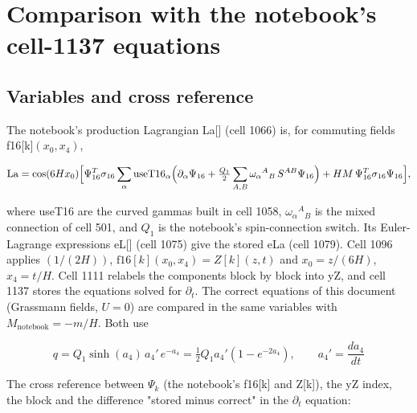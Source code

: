 \documentclass[11pt]{article}
\begin{document}
\section{Comparison with the notebook's cell-1137 equations}

\subsection{Variables and cross reference}

The notebook's production Lagrangian La[] (cell 1066) is, for commuting fields f16[k]$(x_0,x_4)$,

\[
\mathrm{La}=\cos(6Hx_0)\Bigl[\Psi_{16}^T\sigma_{16}\sum_{\alpha}\mathrm{useT16}_\alpha\Bigl(\partial_\alpha\Psi_{16}+\tfrac{Q_1}{2}\sum_{A,B}\omega_\alpha{}^A{}_B\,S^{AB}\Psi_{16}\Bigr)+HM\,\Psi_{16}^T\sigma_{16}\Psi_{16}\Bigr],
\]

where useT16 are the curved gammas built in cell 1058, $\omega_\alpha{}^A{}_B$ is the mixed connection of cell 501, and $Q_1$ is the notebook's spin-connection switch. Its Euler-Lagrange expressions eL[] (cell 1075) give the stored eLa (cell 1079). Cell 1096 applies $(1/(2H))$, $\mathrm{f16}[k](x_0,x_4)=Z[k](z,t)$ and $x_0=z/(6H)$, $x_4=t/H$. Cell 1111 relabels the components block by block into yZ, and cell 1137 stores the equations solved for $\partial_t$. The correct equations of this document (Grassmann fields, $U=0$) are compared in the same variables with $M_{\mathrm{notebook}}=-m/H$. Both use

\[
q=Q_1\sinh(a_4)\,a_4'\,e^{-a_4}=\tfrac12 Q_1a_4'(1-e^{-2a_4}),\qquad a_4'=\frac{da_4}{dt}
\]

The cross reference between $\Psi_k$ (the notebook's f16[k] and Z[k]), the yZ index, the block and the difference "stored minus correct" in the $\partial_t$ equation:
\end{document}
